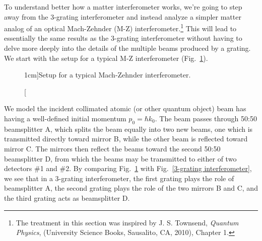 To understand better how a matter interferometer works, we're going to step away from the 3-grating interferometer and instead analyze a simpler matter analog of an optical Mach-Zehnder (M-Z) interferometer.\footnote{The treatment in this section was inspired by J. S. Townsend, {\em Quantum Physics}, (University Science Books, Sausalito, CA, 2010), Chapter 1.}  This will lead to essentially the same results as the 3-grating interferometer without having to delve more deeply into the details of the multiple beams produced by a grating. We start with the setup for  a typical M-Z interferometer (Fig.~\ref{M-Z setup}).  
%
\begin{figure}
\centering
{}
\caption[][1cm]{Setup for a typical  Mach-Zehnder interferometer.}
\label{M-Z setup}
\end{figure}
%

We model the incident collimated atomic (or other quantum object) beam has having a well-defined initial momentum $p_{0} = \hbar k_{0}$. The beam passes through 50:50 beamsplitter A, which splits the beam equally into two new beams, one which is transmitted directly toward mirror B, while the other beam is reflected toward mirror C.  The mirrors then reflect the beams  toward the second 50:50 beamsplitter D, from which the beams may be transmitted to either of two detectors \#1 and \#2.  By comparing Fig.~\ref{M-Z setup} with Fig.~\ref{3-grating interferometer}, we see that in a 3-grating interferometer, the first grating plays the role of beamsplitter A, the second grating plays the role of the two mirrors B and C, and the third grating acts as beamsplitter D.  

